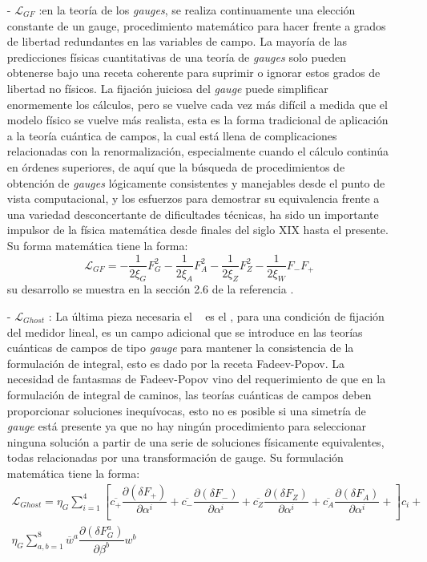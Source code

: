 \begin{itemize}
\item[-] $\mathcal{L}_{GF}$ :en la teoría de los \textit{gauges}, se realiza continuamente una elección constante de un gauge, procedimiento matemático para hacer frente a grados de libertad redundantes en las variables de campo. La mayoría de las predicciones físicas cuantitativas de una teoría de \textit{gauges} solo pueden obtenerse bajo una receta coherente para suprimir o ignorar estos grados de libertad no físicos. La fijación juiciosa del \textit{gauge} puede simplificar enormemente los cálculos, pero se vuelve cada vez más difícil a medida que el modelo físico se vuelve más realista, esta es la forma tradicional de aplicación a la teoría cuántica de campos, la cual está llena de complicaciones relacionadas con la renormalización, especialmente cuando el cálculo continúa en órdenes superiores, de aquí que la búsqueda de procedimientos de obtención de \textit{gauges} lógicamente consistentes y manejables desde el punto de vista computacional, y los esfuerzos para demostrar su equivalencia frente a una variedad desconcertante de dificultades técnicas, ha sido un importante impulsor de la física matemática desde finales del siglo XIX hasta el presente. Su forma matemática tiene la forma:
\begin{equation}
\mathcal{L}_{GF} = - 
\dfrac{1}{2\xi_G}F^2_G -
\dfrac{1}{2\xi_A}F^2_A -
\dfrac{1}{2\xi_Z}F^2_Z -
\dfrac{1}{2\xi_W}F_-F_+
\end{equation}
su desarrollo se muestra en la sección 2.6 de la referencia \citep{romao_resource_2012}.

\item[-] $\mathcal{L}_{Ghost}$ : La última pieza necesaria el \ME ~ es el \LG, para una condición de fijación del medidor lineal, es un campo adicional que se introduce en las teorías cuánticas de campos de tipo \textit{gauge} para mantener la consistencia de la formulación de integral, esto es dado por la receta Fadeev-Popov.  La necesidad de fantasmas de Fadeev-Popov vino del requerimiento de que en la formulación de integral de caminos, las teorías cuánticas de campos deben proporcionar soluciones inequívocas, esto no es posible si una simetría de \textit{gauge} está presente ya que no hay ningún procedimiento para seleccionar ninguna solución a partir de una serie de soluciones físicamente equivalentes, todas relacionadas por una transformación de gauge. Su formulación matemática tiene la forma:
\begin{eqnarray}
\mathcal{L}_{Ghost}  = \eta_G \sum_{i=1}^4 \left[ 
\overline{c_+} \dfrac{\partial(\delta F_+)}{\partial\alpha^i} +
\overline{c_-} \dfrac{\partial(\delta F_-)}{\partial\alpha^i} +
\overline{c_Z} \dfrac{\partial(\delta F_Z)}{\partial\alpha^i} +
\overline{c_A} \dfrac{\partial(\delta F_A)}{\partial\alpha^i} +
\right]c_i + \nonumber\\
\eta_G \sum_{a,b=1}^8\overline{w}^a \dfrac{\partial(\delta F_G^a)}{\partial\beta^b} w^b 
\end{eqnarray}

\end{itemize}


